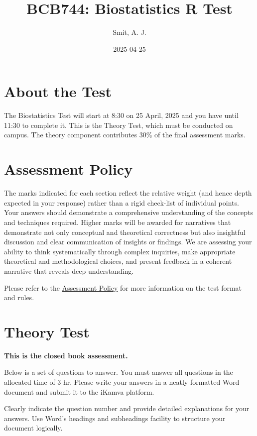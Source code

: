 \documentclass[
  10t,
]{article}
\title{BCB744: Biostatistics R Test}
\author{Smit, A. J.}
\date{2025-04-25}
\begin{document}
\maketitle


\section{About the Test}\label{about-the-test}

The Biostatistics Test will start at 8:30 on 25 April, 2025 and you have
until 11:30 to complete it. This is the Theory Test, which must be
conducted on campus. The theory component contributes 30\% of the final
assessment marks.

\section{Assessment Policy}\label{assessment-policy}

{The marks indicated for each section reflect the relative weight (and
hence depth expected in your response) rather than a rigid check-list of
individual points.} Your answers should demonstrate a comprehensive
understanding of the concepts and techniques required. Higher marks will
be awarded for narratives that demonstrate not only conceptual and
theoretical correctness but also insightful discussion and clear
communication of insights or findings. We are assessing your ability to
think systematically through complex inquiries, make appropriate
theoretical and methodological choices, and present feedback in a
coherent narrative that reveals deep understanding.

Please refer to the
\href{https://tangledbank.netlify.app/BCB744/BCB744_index.html\#sec-policy}{Assessment
Policy} for more information on the test format and rules.

\section{Theory Test}\label{theory-test}

{\textbf{This is the closed book assessment.}}

Below is a set of questions to answer. You must answer all questions in
the allocated time of 3-hr. Please write your answers in a neatly
formatted Word document and submit it to the iKamva platform.

Clearly indicate the question number and provide detailed explanations
for your answers. Use Word's headings and subheadings facility to
structure your document logically.
\end{document}
